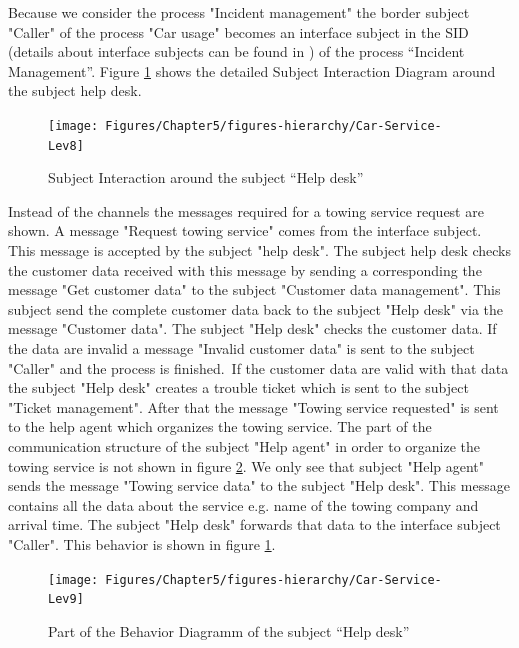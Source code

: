 Because we consider the process "Incident management" the border subject "Caller" of the process "Car usage" becomes an interface subject in the SID (details about interface subjects can be found in \cite{Flei12}) of the process “Incident Management”. Figure \ref{fig:car-service-lev8} shows the detailed Subject Interaction Diagram around the subject help desk. \\

\begin{figure}[htbp]
	\centering
	\texttt{[image: Figures/Chapter5/figures-hierarchy/Car-Service-Lev8]}
	\caption[Subject Interaction around the subject “Help desk”]{Subject Interaction around the subject “Help desk”}
	\label{fig:car-service-lev8}
\end{figure}

Instead of the channels the messages required for a towing service request are shown. A message "Request towing service" comes from the interface subject. This message is accepted by the subject "help desk". The subject help desk checks the customer data received with this message by sending a corresponding the message "Get customer data" to the subject "Customer data management". This subject send the complete customer data back to the subject "Help desk" via the message "Customer data". The subject "Help desk" checks the customer data. If the data are invalid a message "Invalid customer data" is sent to the subject "Caller" and the process is finished.\
If the customer data are valid with that data the subject "Help desk" creates a trouble ticket which is sent to the subject "Ticket management". After that the message "Towing service requested" is sent to the help agent which organizes the towing service. The part of the communication structure of the subject "Help agent" in order to organize the towing service is not shown in figure \ref{fig:car-service-lev9}. We only see that subject "Help agent" sends the message "Towing service data" to the subject "Help desk". This message contains all the data about the service e.g. name of the towing company and arrival time. The subject "Help desk" forwards that data to the interface subject "Caller". This behavior is shown in figure \ref{fig:car-service-lev8}.\\



\begin{figure}[htbp]
	\centering
	\texttt{[image: Figures/Chapter5/figures-hierarchy/Car-Service-Lev9]}
	\caption[Part of the Behavior Diagramm of the subject “Help desk”]{Part of the Behavior Diagramm of the subject “Help desk”}
	\label{fig:car-service-lev9}
\end{figure}


